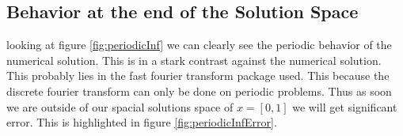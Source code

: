 \documentclass[11pt]{article}
\newlength\figureheight
\newlength\figurewidth
\newif\iftikz
\begin{document}
\subsection{Behavior at the end of the Solution Space}
looking at figure \ref{fig:periodicInf} we can clearly see the periodic behavior of the numerical solution. This is in a stark contrast against the numerical solution. This probably lies in the fast fourier transform package used. This because the discrete fourier transform can only be done on periodic problems. Thus as soon we are outside of our spacial solutions space of $x=[0,1]$ we will get significant error. This is highlighted in figure \ref{fig:periodicInfError}.
\iftikz
\begin{figure}[H]
	\centering
	\begin{subfigure}{.9\linewidth}
		\setlength\figureheight{.5\linewidth}
		\setlength\figurewidth{.9\linewidth}
		
		\caption{The numerical solution ($\psi_n$) plotted against the analytical solution ($\psi_a$).}
		\label{fig:periodicInfPlot}
	\end{subfigure}
	\begin{subfigure}{.9\linewidth}
		\setlength\figureheight{.5\linewidth}
		\setlength\figurewidth{.9\linewidth}
		
		\caption{The error is defined as the difference between the analytical solution and numerical solution.}
		\label{fig:periodicInfError}
	\end{subfigure}
	\label{fig:smallError}
	\caption{The numerical and analytical solution as it passes its solution space of $x=[0,1]$. One can clearly see in figure \ref{fig:periodicInfPlot} that the numerical solution is periodic. The error caused by this is highlighted in figure \ref{fig:periodicInfError}}
\end{figure}
\fi

\newpage
\end{document}
